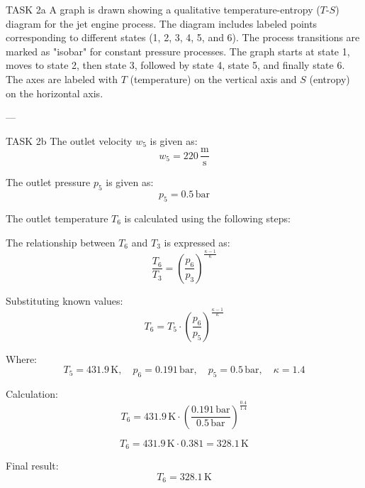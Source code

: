 TASK 2a  
A graph is drawn showing a qualitative temperature-entropy (\( T \)-\( S \)) diagram for the jet engine process. The diagram includes labeled points corresponding to different states (1, 2, 3, 4, 5, and 6). The process transitions are marked as "isobar" for constant pressure processes. The graph starts at state 1, moves to state 2, then state 3, followed by state 4, state 5, and finally state 6. The axes are labeled with \( T \) (temperature) on the vertical axis and \( S \) (entropy) on the horizontal axis.

---

TASK 2b  
The outlet velocity \( w_5 \) is given as:  
\[
w_5 = 220 \, \frac{\text{m}}{\text{s}}
\]

The outlet pressure \( p_5 \) is given as:  
\[
p_5 = 0.5 \, \text{bar}
\]

The outlet temperature \( T_6 \) is calculated using the following steps:  

The relationship between \( T_6 \) and \( T_3 \) is expressed as:  
\[
\frac{T_6}{T_3} = \left( \frac{p_6}{p_3} \right)^{\frac{\kappa - 1}{\kappa}}
\]

Substituting known values:  
\[
T_6 = T_5 \cdot \left( \frac{p_6}{p_5} \right)^{\frac{\kappa - 1}{\kappa}}
\]

Where:  
\[
T_5 = 431.9 \, \text{K}, \quad p_6 = 0.191 \, \text{bar}, \quad p_5 = 0.5 \, \text{bar}, \quad \kappa = 1.4
\]

Calculation:  
\[
T_6 = 431.9 \, \text{K} \cdot \left( \frac{0.191 \, \text{bar}}{0.5 \, \text{bar}} \right)^{\frac{0.4}{1.4}}
\]

\[
T_6 = 431.9 \, \text{K} \cdot 0.381 = 328.1 \, \text{K}
\]

Final result:  
\[
T_6 = 328.1 \, \text{K}
\]